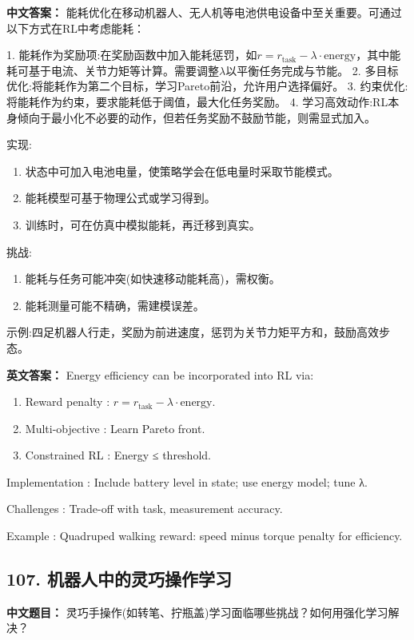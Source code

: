 \documentclass[10pt,a4paper]{ctexart}
\begin{document}
\textbf{中文答案：}  
能耗优化在移动机器人、无人机等电池供电设备中至关重要。可通过以下方式在RL中考虑能耗：

1.  能耗作为奖励项:在奖励函数中加入能耗惩罚，如\(r = r_{\text{task}} - \lambda \cdot \text{energy}\)，其中能耗可基于电流、关节力矩等计算。需要调整\(\lambda\)以平衡任务完成与节能。
2.  多目标优化:将能耗作为第二个目标，学习Pareto前沿，允许用户选择偏好。
3.  约束优化:将能耗作为约束，要求能耗低于阈值，最大化任务奖励。
4.  学习高效动作:RL本身倾向于最小化不必要的动作，但若任务奖励不鼓励节能，则需显式加入。

 实现:
\begin{enumerate}
    \item 状态中可加入电池电量，使策略学会在低电量时采取节能模式。
    \item 能耗模型可基于物理公式或学习得到。
    \item 训练时，可在仿真中模拟能耗，再迁移到真实。
\end{enumerate}

 挑战:
\begin{enumerate}
    \item 能耗与任务可能冲突(如快速移动能耗高)，需权衡。
    \item 能耗测量可能不精确，需建模误差。
\end{enumerate}

 示例:四足机器人行走，奖励为前进速度，惩罚为关节力矩平方和，鼓励高效步态。

\textbf{英文答案：}  
Energy efficiency can be incorporated into RL via:
\begin{enumerate}
    \item Reward penalty : \(r = r_{\text{task}} - \lambda \cdot \text{energy}\).
    \item Multi-objective : Learn Pareto front.
    \item Constrained RL : Energy ≤ threshold.
\end{enumerate}

 Implementation : Include battery level in state; use energy model; tune λ.

 Challenges : Trade-off with task, measurement accuracy.

 Example : Quadruped walking reward: speed minus torque penalty for efficiency.

\subsection*{107. 机器人中的灵巧操作学习}
\textbf{中文题目：} 灵巧手操作(如转笔、拧瓶盖)学习面临哪些挑战？如何用强化学习解决？
\end{document}
